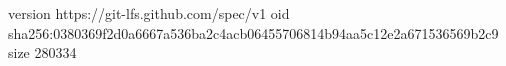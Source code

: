 version https://git-lfs.github.com/spec/v1
oid sha256:0380369f2d0a6667a536ba2c4acb06455706814b94aa5c12e2a671536569b2c9
size 280334
